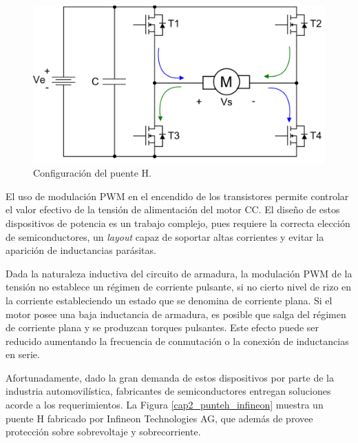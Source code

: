 \begin{figure}[ht]
  \centering
  \includegraphics[scale=.2]{img/cap2/puenteh}
  \caption{Configuración del puente H.}
  \label{cap2_punteh}
\end{figure}

El uso de modulación PWM en el encendido de los transistores permite controlar el valor efectivo de la tensión de alimentación del motor CC. El diseño de estos dispositivos de potencia es un trabajo complejo, pues requiere la correcta elección de semiconductores, un \textit{layout} capaz de soportar altas corrientes y evitar la aparición de inductancias parásitas.

Dada la naturaleza inductiva del circuito de armadura, la modulación PWM de la tensión no establece un régimen de corriente pulsante, si no cierto nivel de rizo en la corriente estableciendo un estado que se denomina de corriente plana. Si el motor posee una baja inductancia de armadura, es posible que salga del régimen de corriente plana y se produzcan torques pulsantes. Este efecto puede ser reducido aumentando la frecuencia de conmutación o la conexión de inductancias en serie.

Afortunadamente, dado la gran demanda de estos dispositivos por parte de la industria automovilística, fabricantes de semiconductores entregan soluciones acorde a los requerimientos. La Figura \ref{cap2_punteh_infineon} muestra un puente H fabricado por Infineon Technologies AG\textregistered, que además de provee protección sobre sobrevoltaje y sobrecorriente.

